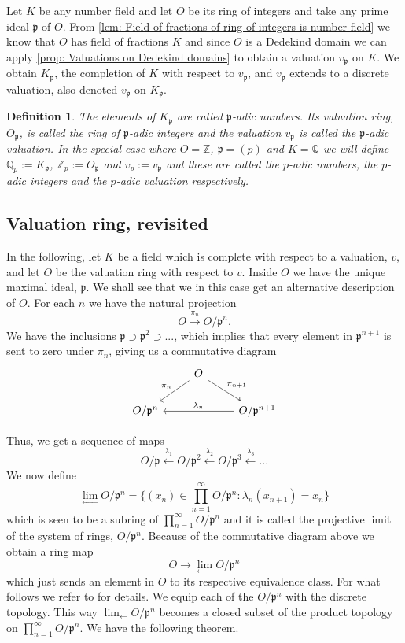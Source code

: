 \documentclass{article}
\newtheorem{definition}{Definition}[section]
\newcommand{\mfrak}[1]{\mathfrak{#1}}
\newcommand{\mbb}[1]{\mathbb{#1}}
\newcommand{\vp}{{v_{\mfrak p}}}
\numberwithin{equation}{section}
\begin{document}
Let $K$ be any number field and let $O$ be its ring of integers and take any prime ideal $\mfrak p$ of $O$. From
\cref{lem: Field of fractions of ring of integers is number field} we know that $O$ has field of fractions $K$ and since $O$ is a Dedekind domain we can apply \cref{prop: Valuations on Dedekind domains} to obtain a valuation $\vp$ on $K$. We obtain $K_\mfrak p$, the completion of $K$ with respect to $\vp$, and $\vp$ extends to a discrete valuation, also denoted $\vp$ on $K_\mfrak p$.

\begin{definition}\label{def: P-adic numbers}
The elements of $K_\mfrak p$ are called $\mfrak p$-adic numbers. Its valuation ring, $O_\mfrak p$, is called the ring of $\mfrak p$-adic integers and the valuation $\vp$ is called the $\mfrak p$-adic valuation. In the special case where $O = \mbb Z$, $\mfrak p = (p)$ and $K = \mbb Q$ we will define $\mbb Q_p := K_\mfrak p$, $\mbb Z_p := O_\mfrak p$ and $v_p := \vp$ and these are called the $p$-adic numbers, the $p$-adic integers and the $p$-adic valuation respectively.
\end{definition}  

\subsection{Valuation ring, revisited}\label{sec: Revisit the valuation ring}
In the following, let $K$ be a field which is complete with respect to a valuation, $v$, and let $O$ be the valuation ring with respect to $v$. Inside $O$ we have the unique maximal ideal, $\mfrak p$. We shall see that we in this case get an alternative description of $O$. For each $n$ we have the natural projection
$$O \xrightarrow{\pi_n} O / \mfrak p^n.$$
We have the inclusions $\mfrak p \supset \mfrak p^2 \supset ...$, which implies that every element in $\mfrak p^{n+1}$ is sent to zero under $\pi_n$, giving us a commutative diagram
$$\begin{tikzcd}
    	& O \arrow[ld, "\pi_{n}"'] \arrow[rd, "\pi_{n+1}"] & \\
    	O / \mfrak p^{n} & & O / \mfrak p^{n+1} \arrow[ll, "\lambda_{n}"']
	\end{tikzcd}$$

Thus, we get a sequence of maps
$$O / \mfrak p \xleftarrow {\lambda_1} O / \mfrak p^2 \xleftarrow {\lambda_2} O / \mfrak p^3 \xleftarrow {\lambda_3} ...$$
We now define
$$\lim_{\leftarrow} O / \mfrak p^n = \{ (x_n) \in \prod_{n=1}^\infty O / \mfrak p^n : \lambda_n(x_{n+1}) = x_n \}$$
which is seen to be a subring of $\prod_{n=1}^\infty O / \mfrak p^n$ and it is called the projective limit of the system of rings, $O / \mfrak p^n$. Because of the commutative diagram above we obtain a ring map
$$O \to \lim_{\leftarrow} O / \mfrak p^n$$
which just sends an element in $O$ to its respective equivalence class. For what follows we refer to \citep[p. 128]{neukirch} for details. We equip each of the $O / \mfrak p^n$ with the discrete topology. This way $\lim_{\leftarrow} O / \mfrak p^n$ becomes a closed subset of the product topology on $\prod_{n=1}^\infty O / \mfrak p^n$. We have the following theorem.
\end{document}
